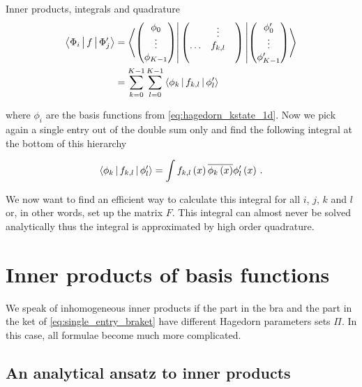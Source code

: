 \begin{chapter}{Inner products, integrals and quadrature}
\begin{equation}
\begin{split}
  \Braket{\Phi_i | f | \Phi_j^\prime} & =
    \Bra{
    \begin{pmatrix}
    \phi_0     \\
    \vdots     \\
    \phi_{K-1}
    \end{pmatrix}
    }
    \begin{pmatrix}
    {}     & \vdots  & {} \\
    \hdots & f_{k,l} & {} \\
    {}     &         & {}
    \end{pmatrix}
    \Ket{
    \begin{pmatrix}
    \phi_0^\prime     \\
    \vdots     \\
    \phi_{K-1}^\prime
    \end{pmatrix}
    } \\
  & = \sum_{k=0}^{K-1} \sum_{l=0}^{K-1} \Braket{\phi_k | f_{k,l} | \phi_l^\prime}
\end{split}
\end{equation}

where $\phi_i$ are the basis functions from \eqref{eq:hagedorn_kstate_1d}. Now we
pick again a single entry out of the double sum only and find the following
integral at the bottom of this hierarchy

\begin{equation} \label{eq:single_entry_braket}
  \Braket{\phi_k | f_{k,l} | \phi_l^\prime} = \int f_{k,l}\left( x \right) \overline{\phi_k\left( x \right)} \phi_l^\prime\left( x \right) \,.
\end{equation}

We now want to find an efficient way to calculate this integral for all $i$, $j$, $k$ and $l$
or, in other words, set up the matrix $F$. This integral can almost never be solved
analytically thus the integral is approximated by high order quadrature.


\section{Inner products of basis functions}

We speak of inhomogeneous inner products if the part in the bra and the part in
the ket of \eqref{eq:single_entry_braket} have different Hagedorn parameters sets $\Pi$.
In this case, all formulae become much more complicated.

\subsection{An analytical ansatz to inner products}


\end{chapter}
